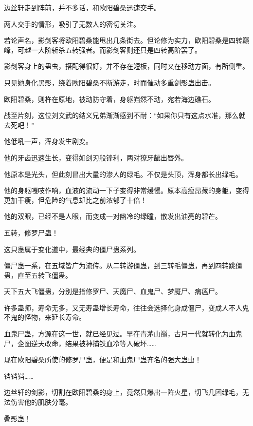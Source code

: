 
\begin{this_body}

边丝轩走到阵前，并不多话，和欧阳碧桑迅速交手。

两人交手的情形，吸引了无数人的密切关注。

若论声名，影剑客将欧阳碧桑能甩出几条街去。但论修为实力，欧阳碧桑是四转巅峰，可越一大阶斩杀五转强者。而影剑客则还只是四转高阶罢了。

影剑客身上的蛊虫，搭配得很好，并不存在短板，同时又在移动方面，有所侧重。

只见她身化黑影，绕着欧阳碧桑不断游走，时而催动多重剑影蛊出击。

欧阳碧桑，则杵在原地，被动防守着，身躯岿然不动，宛若海边礁石。

战至片刻，这位刘文武的结义兄弟渐渐感到不耐：“如果你只有这点水准，那么就去死吧！”

他低吼一声，浑身发生剧变。

他的牙齿迅速生长，变得如剑刃般锋利，两对獠牙龇出唇外。

他原本是光头，但此刻冒出大量的渗人的绿毛。不仅是头顶，浑身都长出绿毛。

他的身躯嘎吱作响，血液的流动一下子变得非常缓慢。原本高瘦昂藏的身躯，变得更加干瘦，但危险的气息却比之前浓郁了十倍！

他的双眼，已经不是人眼，而变成一对幽冷的绿瞳，散发出油亮的碧芒。

五转，修罗尸蛊！

这只蛊属于变化道中，最经典的僵尸蛊系列。

僵尸蛊一系，在五域皆广为流传。从二转游僵蛊，到三转毛僵蛊，再到四转跳僵蛊，直至五转飞僵蛊。

天下五大飞僵蛊，分别是指修罗尸、天魔尸、血鬼尸、梦魇尸、病瘟尸。

许多蛊师，寿命无多，又无寿蛊增长寿命，往往会选择化身成僵尸，变成人不人鬼不鬼的怪物，来延长寿命。

血鬼尸蛊，方源在这一世，就已经见过。早在青茅山巅，古月一代就转化为血鬼尸，企图逆天改命，结果被神捕铁血冷等人破坏……

现在欧阳碧桑所使的修罗尸蛊，便是和血鬼尸蛊齐名的强大蛊虫！

铛铛铛……

边丝轩的剑影，切割在欧阳碧桑的身上，竟然只爆出一阵火星，切飞几团绿毛，无法伤害他的肌肤分毫。

叠影蛊！


\end{this_body}
